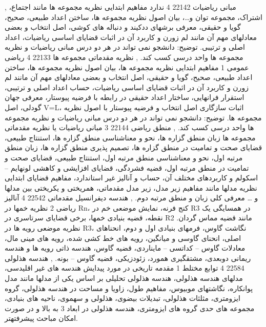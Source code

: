 \documentclass[class=article, crop=false]{standalone}
\begin{document}
{{{{        }}
        },{{
            مبانی ریاضیات
        }{
            22142
        }{
            4
        }{
            ندارد
        }{}{{
            مفاهیم ابتدایی نظریه مجموعه ها مانند اجتماع، اشتراک، مجموعه توان و…، بیان اصول نظریه مجموعه ها، ساختن اعداد طبیعی، صحیح، گویا و حقیقی، معرفی برشهای ددکیند و دنباله های کوشی، اصل انتخاب و بعضی معادلهای مهم آن مانند لم زورن و کاربرد آن در اثبات قضایای اساسی ریاضیات، اعداد اصلی و ترتیبی. توضیح: دانشجو نمی تواند در هر دو درس مبانی ریاضیات و نظریه مجموعه ها واحد درسی کسب کند.
        }}
        },{{
            نظریه مقدماتی مجموعه ها
        }{
            22133
        }{
            4
        }{
            ریاضی عمومی 1
        }{}{{
            مفاهیم ابتدایی نظریه مجموعه ها، بیان اصول نظریه مجموعه ها، ساختن اعداد طبیعی، صحیح، گویا و حقیقی، اصل انتخاب و بعضی معادلهای مهم آن مانند لم زورن و کاربرد آن در اثبات قضایای اساسی ریاضیات، حساب اعداد اصلی و ترتیبی، استقرار فرانهایی، ساختار اعداد حقیقی در رابطه با فرضیه پیوستار، معرفی جهان گودلی، اصل V=L، اثبات سازگاری اصل انتخاب و فرضیه پیوستار با اصول نظریه مجموعه ها. توضیح: دانشجو نمی تواند در هر دو درس مبانی ریاضیات و نظریه مجموعه ها واحد درسی کسب کند.
        }}
        },{{
            منطق ریاضی
        }{
            22144
        }{
            3
        }{
            مبانی ریاضیات یا نظریه مقدماتی مجموعه ها
        }{}{{
            زبان منطق گزاره ها، نحو و معناشناسی منطق گزاره ها، استنتاج طبیعی، قضایای صحت و تمامیت در منطق گزاره ها، تصمیم پذیری منطق گزاره ها، زبان منطق مرتبه اول، نحو و معناشناسی منطق مرتبه اول، استنتاج طبیعی، قضایای صحت و تمامیت در منطق مرتبه اول، قضیه فشردگی، قضایای افزایشی و کاهشی لونهایم – اسکولم و کاربردهای مختلف آن، حساب و آنالیز غیر استاندارد، مفاهیم قضایای ابتدایی نظریه مدلها مانند مفاهیم زیر مدل، زیر مدل مقدماتی، همریختی و یکریختی بین مدلها و … معرفی کلی زبان و منطق مرتبه دوم.
        }}
        },{{
            هندسه دیفرانسیل مقدماتی
        }{
            22542
        }{
            4
        }{
            آنالیز ریاضی 2
        }{}{{
            نظریه خمها در Rn، کنج فرنه، نمایش موضعی خم در R3 در همسایگی یک نقطه، قضیه بنیادی خمها، برخی قضایای سرتاسری در R2 مانند قضیه مماس گردان. نظریه موضعی رویه ها در R3، نگاشت گاوس، فرمهای بنیادی اول و دوم، انحناهای اصلی، انحنای گاوسی و میانگین، رویه های خط کشی شده، رویه های مینی مال، معادلات گاوس – کداتسی – مایناردی، قضیه گاوس، هندسه ذاتی رویه ها و هندسه ریمانی دوبعدی، مشتقگیری همورد، زئودزیکی، قضیه گاوس – بونه.
        }}
        },{{
            هندسه هذلولی
        }{
            22584
        }{
            4
        }{
            توابع مختلط 1
        }{}{{
            مقدمه تاریخی در مورد پیدایش هندسه های غیر اقلیدسی، مدلهای هندسه هذلولی، هندسه هذلولی تحلیلی بر اساس یکی از مدلها مانند مدل پوانکاره، نگاشتهای موبیوس، مفاهیم طول، زاویا و مساحت در هندسه هذلولی، گروه ایزومتری، مثلثات هذلولی، تبدیلات بیضوی، هذلولی و سهموی، ناحیه های بنیادی، مجموعه های حدی گروه های ایزومتری، هندسه هذلولی در ابعاد 3 به بالا و در صورت امکان مباحث پیشرفتهتر.
}}}}
\end{document}
